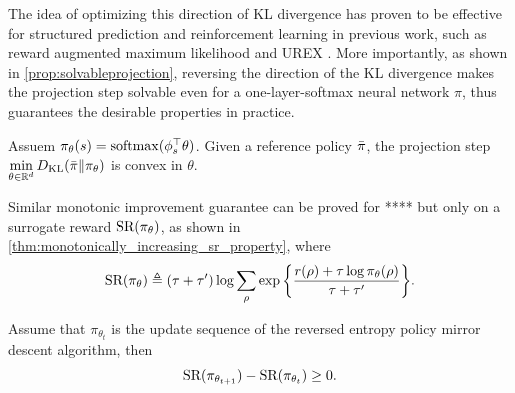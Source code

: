 \documentclass{article} %
\begin{document}
The idea of optimizing this direction of KL divergence has proven to be effective for structured prediction and reinforcement learning in previous work, such as reward augmented maximum likelihood \citep{norouzi2016reward} and UREX \citep{nachum2017improving}.
More importantly, as shown in \cref{prop:solvableprojection}, reversing the direction of the KL divergence makes the projection step solvable even for a one-layer-softmax neural network $\pi$, thus guarantees the desirable properties in practice.
\begin{prop}
	
	Assuem $\pi_\theta(s) = \mathrm{softmax}(\phi_s^{\top}\theta)$. Given a reference policy $\bar{\pi}$, the projection step $\min\limits_{\theta \in \mathbb{R}^d}{D_{\mathrm{KL}}(\bar{\pi} \| \pi_\theta)}$ is convex in $\theta$.
\end{prop}
\label{prop:solvableprojection}
Similar monotonic improvement guarantee can be proved for **** but only on a surrogate reward $\text{SR}(\pi_\theta) $, as shown in \cref{thm:monotonically_increasing_sr_property}, where
\begin{equation*}
\text{SR}(\pi_\theta) \triangleq (\tau + \tau^{\prime})\log{ \sum_{\rho}{ \exp\left\{ \frac{r(\rho) + \tau \log{\pi_\theta(\rho)} }{\tau + \tau^{\prime}} \right\} }}.
\end{equation*}
\begin{thm}
\label{thm:monotonically_increasing_sr_property}
Assume that $\pi_{\theta_{t}}$ is the update sequence of the reversed entropy policy mirror descent algorithm, then
\begin{equation*}
	\text{SR}(\pi_{\theta_{t+1}}) - \text{SR}(\pi_{\theta_t})\ge 0.
\end{equation*}
\end{thm}
\end{document}
